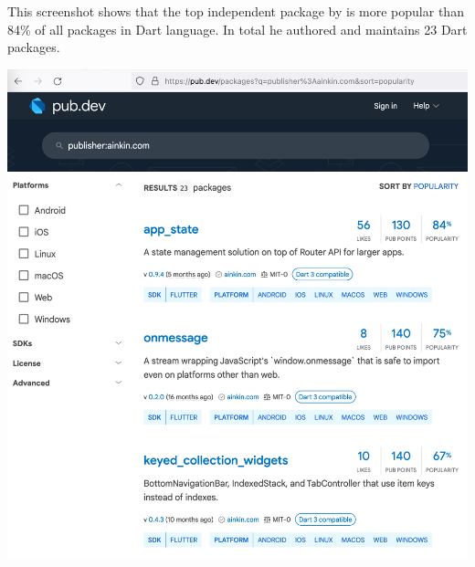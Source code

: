 
This screenshot shows that the top independent package by \mrl is more popular
than 84\% of all packages in Dart language.
In total he authored and maintains 23 Dart packages.

\begin{center}
    \includegraphics[width=40em]{pub-ainkin-p1}
\end{center}
\WillContinue
\pagebreak

